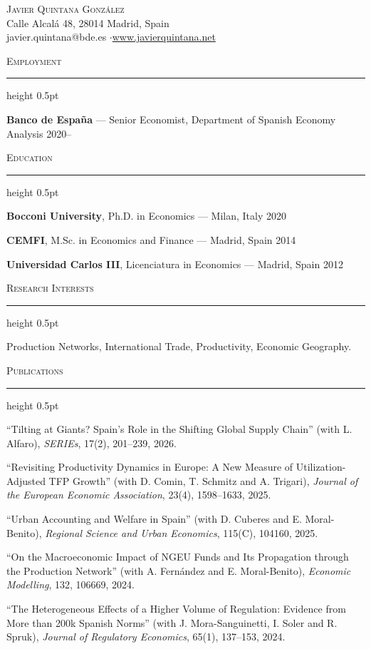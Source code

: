 \documentclass[11pt]{article}
\newcommand{\cvsection}[1]{%
  \vspace{1.1em}\par
  {\large\scshape #1}\par
  \vspace{0.15em}
  \hrule height 0.5pt
  \vspace{0.7em}
}
\newcommand{\dated}[2]{%
  \noindent #1 \hfill #2 \par \vspace{0.35em}
}
\newenvironment{cvlist}{%
  \begin{list}{}{%
    \setlength{\leftmargin}{1.4em}%
    \setlength{\itemindent}{-1.4em}%
    \setlength{\itemsep}{0.55em}%
    \setlength{\parsep}{0pt}%
    \setlength{\topsep}{0pt}}%
}{\end{list}}
\begin{document}
\begin{center}
  {\LARGE\scshape Javier Quintana González}\\[0.7em]
  {\small
  Calle Alcalá 48, 28014 Madrid, Spain\\[0.2em]
  javier.quintana@bde.es \quad$\cdot$\quad \href{https://www.javierquintana.net}{www.javierquintana.net}
  }
\end{center}
\vspace{0.4em}

\cvsection{Employment}
\dated{\textbf{Banco de España} --- Senior Economist, Department of Spanish Economy Analysis}{2020--}

\cvsection{Education}
\dated{\textbf{Bocconi University}, Ph.D. in Economics --- Milan, Italy}{2020}
\dated{\textbf{CEMFI}, M.Sc. in Economics and Finance --- Madrid, Spain}{2014}
\dated{\textbf{Universidad Carlos III}, Licenciatura in Economics --- Madrid, Spain}{2012}

\cvsection{Research Interests}
Production Networks, International Trade, Productivity, Economic Geography.

\cvsection{Publications}
\begin{cvlist}
\item ``Tilting at Giants? Spain's Role in the Shifting Global Supply Chain'' (with L. Alfaro), \textit{SERIEs}, 17(2), 201--239, 2026.
\item ``Revisiting Productivity Dynamics in Europe: A New Measure of Utilization-Adjusted TFP Growth'' (with D. Comin, T. Schmitz and A. Trigari), \textit{Journal of the European Economic Association}, 23(4), 1598--1633, 2025.
\item ``Urban Accounting and Welfare in Spain'' (with D. Cuberes and E. Moral-Benito), \textit{Regional Science and Urban Economics}, 115(C), 104160, 2025.
\item ``On the Macroeconomic Impact of NGEU Funds and Its Propagation through the Production Network'' (with A. Fernández and E. Moral-Benito), \textit{Economic Modelling}, 132, 106669, 2024.
\item ``The Heterogeneous Effects of a Higher Volume of Regulation: Evidence from More than 200k Spanish Norms'' (with J. Mora-Sanguinetti, I. Soler and R. Spruk), \textit{Journal of Regulatory Economics}, 65(1), 137--153, 2024.
\end{cvlist}
\end{document}
